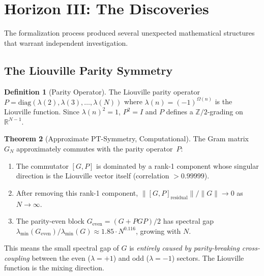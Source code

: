 \documentclass[11pt,a4paper]{article}
\theoremstyle{definition}
\newtheorem{definition}{Definition}[section]
\newtheorem{theorem}[definition]{Theorem}
\newcommand{\ZZ}{\mathbb{Z}}
\newcommand{\RR}{\mathbb{R}}
\begin{document}
\section{Horizon III: The Discoveries}
\label{sec:discoveries}

The formalization process produced several unexpected mathematical
structures that warrant independent investigation.

\subsection{The Liouville Parity Symmetry}

\begin{definition}[Parity Operator]
The Liouville parity operator $P = \mathrm{diag}(\lambda(2), \lambda(3),
\ldots, \lambda(N))$ where $\lambda(n) = (-1)^{\Omega(n)}$ is the
Liouville function. Since $\lambda(n)^2 = 1$, $P^2 = I$ and $P$
defines a $\ZZ/2$-grading on $\RR^{N-1}$.
\end{definition}

\begin{theorem}[Approximate PT-Symmetry, Computational]
The Gram matrix $G_N$ approximately commutes with the parity operator~$P$:
\begin{enumerate}
  \item The commutator $[G, P]$ is dominated by a rank-1 component whose
    singular direction is the Liouville vector itself (correlation $> 0.99999$).
  \item After removing this rank-1 component,
    $\|[G,P]_{\mathrm{residual}}\|/\|G\| \to 0$ as $N \to \infty$.
  \item The parity-even block $G_{\mathrm{even}} = (G + PGP)/2$ has
    spectral gap $\lambda_{\min}(G_{\mathrm{even}})/\lambda_{\min}(G)
    \approx 1.85 \cdot N^{0.116}$, growing with $N$.
\end{enumerate}
\end{theorem}

This means the small spectral gap of $G$ is \emph{entirely caused by
parity-breaking cross-coupling} between the even ($\lambda = +1$) and
odd ($\lambda = -1$) sectors. The Liouville function is the mixing
direction.
\end{document}

